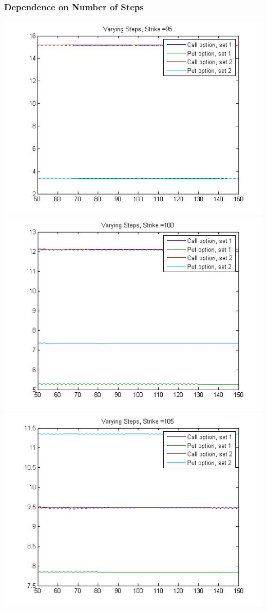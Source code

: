 \documentclass[12pt]{article}
\begin{document}
    \subsubsection*{Dependence on Number of Steps}
    \begin{center}
      \includegraphics[width=6in]{steps95.jpg} \\
      \includegraphics[width=6in]{steps100.jpg} \\
      \includegraphics[width=6in]{steps105.jpg} \\

\end{center}
\end{document}
